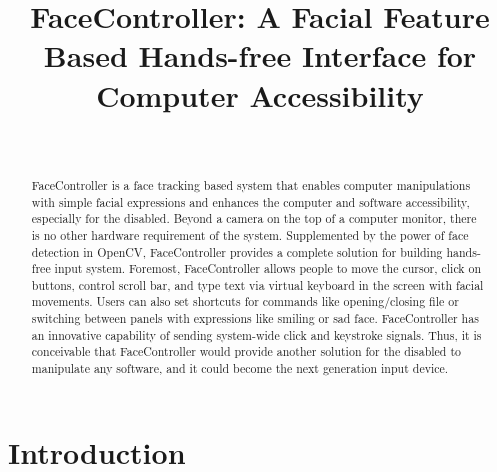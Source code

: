 \documentclass{sigchi}
\begin{document}
\title{FaceController: A Facial Feature Based Hands-free Interface for Computer Accessibility}

\author{%
  \\
}

\maketitle

\begin{abstract}
FaceController is a face tracking based system that enables computer manipulations with simple facial expressions and enhances the computer and software accessibility, especially for the disabled.
Beyond a camera on the top of a computer monitor, there is no other hardware requirement of the system.
Supplemented by the power of face detection in OpenCV, FaceController provides a complete solution for building hands-free input system.
Foremost, FaceController allows people to move the cursor, click on buttons, control scroll bar, and type text via virtual keyboard in the screen with facial movements.  
Users can also set shortcuts for commands like opening/closing file or switching between panels with expressions like smiling or sad face.
FaceController has an innovative capability of sending system-wide click and keystroke signals.
Thus, it is conceivable that FaceController would provide another solution for the disabled to manipulate any software, and it could become the next generation input device. 
\end{abstract}


\section{Introduction}
\end{document}
